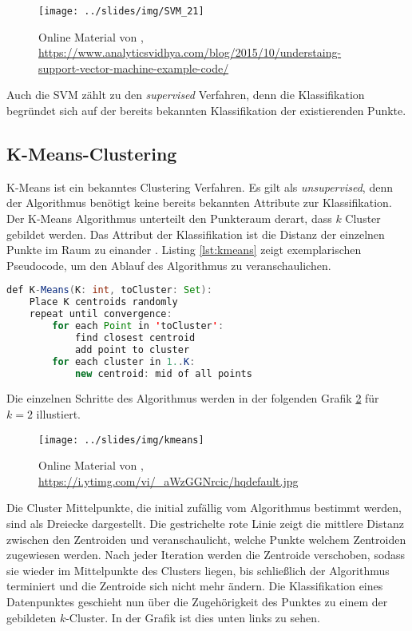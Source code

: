 \begin{figure}[h]
    \centering
    \texttt{[image: ../slides/img/SVM\_21]}
    \caption{Online Material von \cite{ray2015}, \url{https://www.analyticsvidhya.com/blog/2015/10/understaing-support-vector-machine-example-code/}\label{fig:svm}}
\end{figure}

Auch die SVM zählt zu den \textit{supervised} Verfahren, denn die Klassifikation begründet sich auf der bereits bekannten Klassifikation der existierenden Punkte.

\subsection{K-Means-Clustering}

K-Means ist ein bekanntes Clustering Verfahren. Es gilt als \textit{unsupervised}, denn der Algorithmus benötigt keine bereits bekannten Attribute zur Klassifikation. Der K-Means Algorithmus unterteilt den Punkteraum derart, dass $k$ Cluster gebildet werden. Das Attribut der Klassifikation ist die Distanz der einzelnen Punkte im Raum zu einander \cite{datamining2011}. Listing \ref{lst:kmeans} zeigt exemplarischen Pseudocode, um den Ablauf des Algorithmus zu veranschaulichen.

\begin{center}
\begin{lstlisting}[caption={K-Means Algorithmus \cite{lavrenko2013}},label=lst:kmeans,language=JAVA,label={lst:kmeans}]
def K-Means(K: int, toCluster: Set):
    Place K centroids randomly
    repeat until convergence:
        for each Point in 'toCluster':
            find closest centroid
            add point to cluster
        for each cluster in 1..K:
            new centroid: mid of all points
\end{lstlisting}
\end{center}

Die einzelnen Schritte des Algorithmus werden in der folgenden Grafik \ref{fig:kmeans} für $k = 2$ illustiert.

\begin{figure}[h]
    \centering
    \texttt{[image: ../slides/img/kmeans]}
    \caption{Online Material von \cite{lavrenko2013}, \url{https://i.ytimg.com/vi/_aWzGGNrcic/hqdefault.jpg}\label{fig:kmeans}}
\end{figure}

Die Cluster Mittelpunkte, die initial zufällig vom Algorithmus bestimmt werden, sind als Dreiecke dargestellt. Die gestrichelte rote Linie zeigt die mittlere Distanz zwischen den Zentroiden und veranschaulicht, welche Punkte welchem Zentroiden zugewiesen werden. Nach jeder Iteration werden die Zentroide verschoben, sodass sie wieder im Mittelpunkte des Clusters liegen, bis schließlich der Algorithmus terminiert und die Zentroide sich nicht mehr ändern. Die Klassifikation eines Datenpunktes geschieht nun über die Zugehörigkeit des Punktes zu einem der gebildeten $k$-Cluster. In der Grafik ist dies unten links zu sehen.